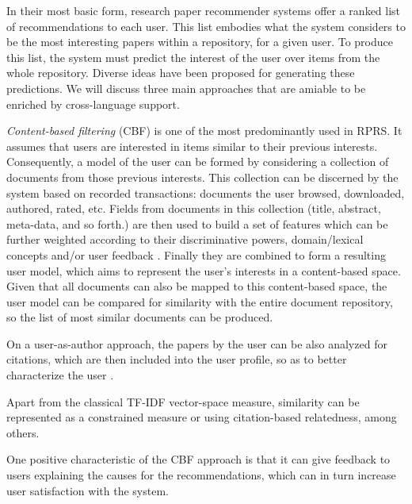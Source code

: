 \documentclass{llncs}
\begin{document}
In their most basic form, research paper recommender systems offer a ranked list of recommendations to each user. This list embodies what the system considers to be the most interesting papers within a repository, for a given user. To produce this list, the system must predict the interest of the user over items from the whole repository. Diverse ideas have been proposed for generating these predictions. We will discuss three main approaches that are amiable to be enriched by cross-language support. 

\textit{Content-based filtering} (CBF) is one of the most predominantly used in RPRS\cite{beel2014research}. It assumes that users are interested in items similar to their previous interests.  Consequently, a model of the user can be formed by considering a collection of documents from those previous interests. This collection can be discerned by the system based on recorded transactions: documents the user browsed, downloaded, authored, rated, etc. Fields from documents in this collection (title, abstract, meta-data\cite{nascimento2011source}, and so forth.) are then used to build a set of features which can be further weighted according to their discriminative powers, domain/lexical concepts and/or user feedback \cite{lops2011content}. Finally they are combined to form a resulting user model, which aims to represent the user's interests in a content-based space. Given that all documents can also be mapped to this content-based space, the user model can be compared for similarity with the entire document repository, so the list of most similar documents can be produced.

On a user-as-author approach, the papers by the user can be also analyzed for citations, which are then included into the user profile, so as to better characterize the user \cite{sugiyama2010scholarly}\cite{strohman2007recommending}. 

Apart from the classical TF-IDF vector-space measure, similarity can be represented as a constrained measure or using citation-based relatedness, among others\cite{bollacker2000discovering}. 

One positive characteristic of the CBF approach is that it can give feedback to users explaining the causes for the recommendations, which can in turn increase user satisfaction with the system.
\end{document}
